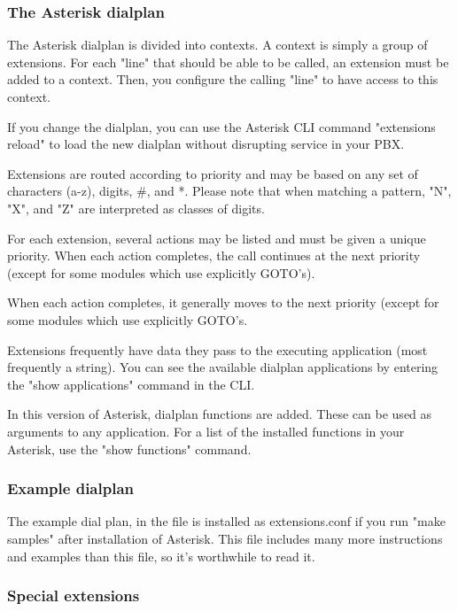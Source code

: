 \subsubsection{The Asterisk dialplan}

The Asterisk dialplan is divided into contexts. A context is simply a group
of extensions. For each "line" that should be able to be called, an extension
must be added to a context. Then, you configure the calling "line" to have
access to this context.

If you change the dialplan, you can use the Asterisk CLI command
"extensions reload" to load the new dialplan without disrupting
service in your PBX.

Extensions are routed according to priority and may be based on any set
of characters (a-z), digits, \#, and *. Please note that when matching a
pattern, "N", "X", and "Z" are interpreted as classes of digits.

For each extension, several actions may be listed and must be given a unique
priority. When each action completes, the call continues at the next priority
(except for some modules which use explicitly GOTO's).

When each action completes, it generally moves to the next priority (except for
some modules which use explicitly GOTO's.

Extensions frequently have data they pass to the executing application
(most frequently a string).  You can see the available dialplan applications
by entering the "show applications" command in the CLI.

In this version of Asterisk, dialplan functions are added. These can
be used as arguments to any application. For a list of the installed
functions in your Asterisk, use the "show functions" command.

\subsubsection{Example dialplan}

The example dial plan, in the  file
is installed as extensions.conf if you run "make samples" after
installation of Asterisk. This file includes many more instructions
and examples than this file, so it's worthwhile to read it.
	
\subsubsection{Special extensions}

